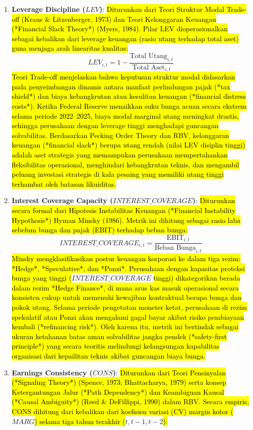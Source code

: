 \documentclass[12pt,a4paper]{article}
\begin{document}
\begin{enumerate}
\item
  \textbf{Leverage Discipline (\(LEV\))}:
  \hl{Diturunkan dari Teori Struktur Modal Trade-off (Kraus \& Litzenberger, 1973) dan Teori Kelonggaran Keuangan (*Financial Slack Theory*) (Myers, 1984). Pilar LEV dioperasionalkan sebagai kebalikan dari leverage keuangan (rasio utang terhadap total aset) guna menjaga arah linearitas kualitas:
  }$$LEV_{i,t} = 1 - \frac{\text{Total Utang}_{i,t}}{\text{Total Aset}_{i,t}}$$\hl{
  Teori Trade-off menjelaskan bahwa keputusan struktur modal didasarkan pada penyeimbangan dinamis antara manfaat perlindungan pajak (*tax shield*) dan biaya kebangkrutan atau kesulitan keuangan (*financial distress costs*). Ketika Federal Reserve menaikkan suku bunga acuan secara ekstrem selama periode 2022--2025, biaya modal marginal utang meningkat drastis, sehingga perusahaan dengan leverage tinggi menghadapi guncangan solvabilitas. Berdasarkan Pecking Order Theory dan RBV, kelonggaran keuangan (*financial slack*) berupa utang rendah (nilai LEV disiplin tinggi) adalah aset strategis yang memampukan perusahaan mempertahankan fleksibilitas operasional, menghindari kebangkrutan teknis, dan mengambil peluang investasi strategis di kala pesaing yang memiliki utang tinggi terhambat oleh batasan likuiditas.}
\item
  \textbf{Interest Coverage Capacity (\(INTEREST\_COVERAGE\))}:
  \hl{Diturunkan secara formal dari Hipotesis Instabilitas Keuangan (*Financial Instability Hypothesis*) Hyman Minsky (1986). Metrik ini dihitung sebagai rasio laba sebelum bunga dan pajak (EBIT) terhadap beban bunga:
  }$$INTEREST\_COVERAGE_{i,t} = \frac{\text{EBIT}_{i,t}}{\text{Beban Bunga}_{i,t}}$$\hl{
  Minsky mengklasifikasikan postur keuangan korporasi ke dalam tiga rezim: *Hedge*, *Speculative*, dan *Ponzi*. Perusahaan dengan kapasitas proteksi bunga yang tinggi (}$INTEREST\_COVERAGE$\hl{ tinggi) dikategorikan berada dalam rezim *Hedge Finance*, di mana arus kas masuk operasional secara konsisten cukup untuk memenuhi kewajiban kontraktual berupa bunga dan pokok utang. Selama periode pengetatan moneter ketat, perusahaan di rezim spekulatif atau Ponzi akan mengalami gagal bayar akibat risiko pembiayaan kembali (*refinancing risk*). Oleh karena itu, metrik ini bertindak sebagai ukuran ketahanan batas aman solvabilitas jangka pendek (*safety-first principle*) yang secara teoritis melindungi kelangsungan kapabilitas organisasi dari kepailitan teknis akibat guncangan biaya bunga.}
\item
  \textbf{Earnings Consistency (\(CONS\))}:
  \hl{Diturunkan dari Teori Pensinyalan (*Signaling Theory*) (Spence, 1973; Bhattacharya, 1979) serta konsep Ketergantungan Jalur (*Path Dependency*) dan Keambiguan Kausal (*Causal Ambiguity*) (Reed \& DeFillippi, 1990) dalam RBV. Secara empiris, CONS dihitung dari kebalikan dari koefisien variasi (CV) margin kotor (}$MARG$\hl{) selama tiga tahun terakhir (}$t, t-1, t-2$\hl{):
}
\end{enumerate}
\end{document}
